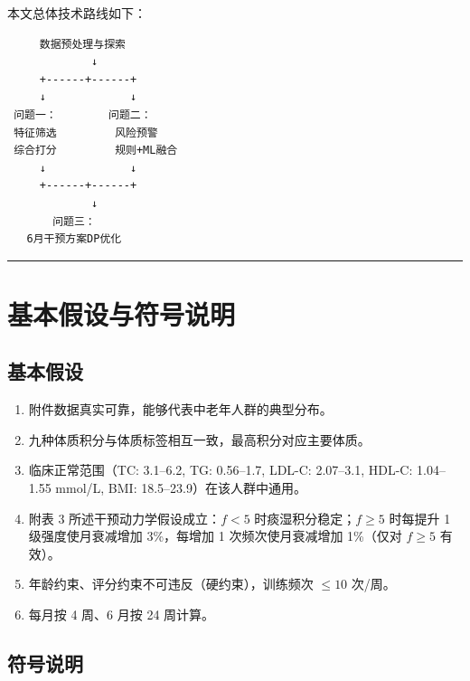 \documentclass{MathorCupmodeling}
\providecommand{\tightlist}{%
  \setlength{\itemsep}{0pt}\setlength{\parskip}{0pt}}
\begin{document}
本文总体技术路线如下：

\begin{verbatim}
     数据预处理与探索
             ↓
     +------+------+ 
     ↓             ↓
 问题一：        问题二：
 特征筛选         风险预警
 综合打分         规则+ML融合
     ↓             ↓
     +------+------+ 
             ↓
       问题三：
   6月干预方案DP优化
\end{verbatim}

\begin{center}\rule{0.5\linewidth}{0.5pt}\end{center}

\section{基本假设与符号说明}\label{ux4e8cux57faux672cux5047ux8bbeux4e0eux7b26ux53f7ux8bf4ux660e}

\subsection{基本假设}\label{ux57faux672cux5047ux8bbe}

\begin{enumerate}
\def\labelenumi{\arabic{enumi}.}
\tightlist
\item
  附件数据真实可靠，能够代表中老年人群的典型分布。
\item
  九种体质积分与体质标签相互一致，最高积分对应主要体质。
\item
  临床正常范围（TC: 3.1--6.2, TG: 0.56--1.7, LDL-C: 2.07--3.1, HDL-C: 1.04--1.55 mmol/L, BMI: 18.5--23.9）在该人群中通用。
\item
  附表 3 所述干预动力学假设成立：\(f < 5\) 时痰湿积分稳定；\(f \ge 5\) 时每提升 1 级强度使月衰减增加 3\%，每增加 1 次频次使月衰减增加 1\%（仅对 \(f \ge 5\) 有效）。
\item
  年龄约束、评分约束不可违反（硬约束），训练频次 \(\le 10\) 次/周。
\item
  每月按 4 周、6 月按 24 周计算。
\end{enumerate}

\subsection{符号说明}\label{ux7b26ux53f7ux8bf4ux660e}
\end{document}
